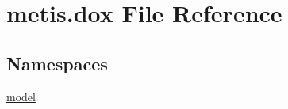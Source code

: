 \hypertarget{metis_8dox}{}\section{metis.\+dox File Reference}
\label{metis_8dox}
\subsection*{Namespaces}
\begin{DoxyCompactItemize}
\item 
 \hyperlink{namespacemodel}{model}
\end{DoxyCompactItemize}
